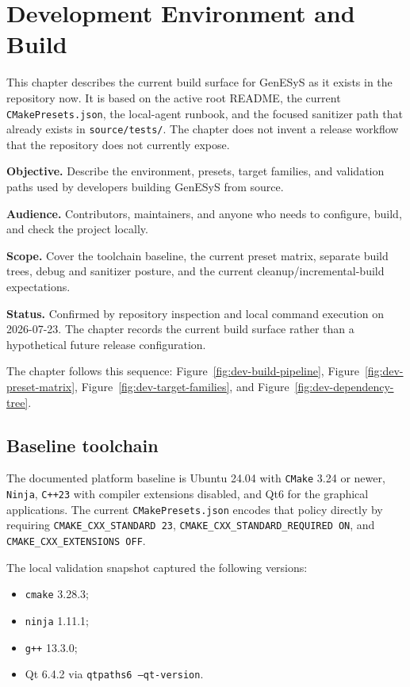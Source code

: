 \chapter{Development Environment and Build}
\label{chap:development-environment-and-build}

This chapter describes the current build surface for GenESyS as it exists in
the repository now. It is based on the active root README, the current
\texttt{CMakePresets.json}, the local-agent runbook, and the focused sanitizer
path that already exists in \texttt{source/tests/}. The chapter does not
invent a release workflow that the repository does not currently expose.

\noindent\textbf{Objective.} Describe the environment, presets, target families,
and validation paths used by developers building GenESyS from source.

\noindent\textbf{Audience.} Contributors, maintainers, and anyone who needs to
configure, build, and check the project locally.

\noindent\textbf{Scope.} Cover the toolchain baseline, the current preset
matrix, separate build trees, debug and sanitizer posture, and the current
cleanup/incremental-build expectations.

\noindent\textbf{Status.} Confirmed by repository inspection and local command
execution on 2026-07-23. The chapter records the current build surface rather
than a hypothetical future release configuration.

The chapter follows this sequence:
Figure~\ref{fig:dev-build-pipeline},
Figure~\ref{fig:dev-preset-matrix},
Figure~\ref{fig:dev-target-families}, and
Figure~\ref{fig:dev-dependency-tree}.

\section{Baseline toolchain}
\label{sec:dev-baseline-toolchain}

The documented platform baseline is Ubuntu 24.04 with \texttt{CMake}
3.24 or newer, \texttt{Ninja}, \texttt{C++23} with compiler extensions
disabled, and Qt6 for the graphical applications. The current
\texttt{CMakePresets.json} encodes that policy directly by requiring
\texttt{CMAKE\_CXX\_STANDARD 23}, \texttt{CMAKE\_CXX\_STANDARD\_REQUIRED ON},
and \texttt{CMAKE\_CXX\_EXTENSIONS OFF}.

The local validation snapshot captured the following versions:
\begin{itemize}
\item \texttt{cmake} 3.28.3;
\item \texttt{ninja} 1.11.1;
\item \texttt{g++} 13.3.0;
\item Qt 6.4.2 via \texttt{qtpaths6 --qt-version}.
\end{itemize}

